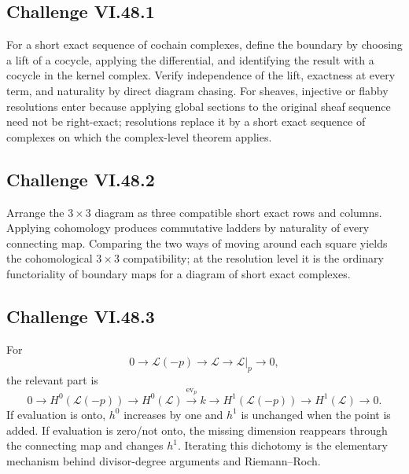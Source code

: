 \subsection*{Challenge VI.48.1}
\begin{solution}
For a short exact sequence of cochain complexes, define the boundary by choosing a lift of a cocycle, applying the differential, and identifying the result with a cocycle in the kernel complex.  Verify independence of the lift, exactness at every term, and naturality by direct diagram chasing.  For sheaves, injective or flabby resolutions enter because applying global sections to the original sheaf sequence need not be right-exact; resolutions replace it by a short exact sequence of complexes on which the complex-level theorem applies.
\end{solution}

\subsection*{Challenge VI.48.2}
\begin{solution}
Arrange the \(3\times3\) diagram as three compatible short exact rows and columns.  Applying cohomology produces commutative ladders by naturality of every connecting map.  Comparing the two ways of moving around each square yields the cohomological \(3\times3\) compatibility; at the resolution level it is the ordinary functoriality of boundary maps for a diagram of short exact complexes.
\end{solution}

\subsection*{Challenge VI.48.3}
\begin{solution}
For
\[
0\to\mathcal L(-p)\to\mathcal L\to\mathcal L|_p\to0,
\]
the relevant part is
\[
0\to H^0(\mathcal L(-p))\to H^0(\mathcal L)\xrightarrow{\mathrm{ev}_p}k
\to H^1(\mathcal L(-p))\to H^1(\mathcal L)\to0.
\]
If evaluation is onto, \(h^0\) increases by one and \(h^1\) is unchanged when the point is added.  If evaluation is zero/not onto, the missing dimension reappears through the connecting map and changes \(h^1\).  Iterating this dichotomy is the elementary mechanism behind divisor-degree arguments and Riemann--Roch.
\end{solution}

